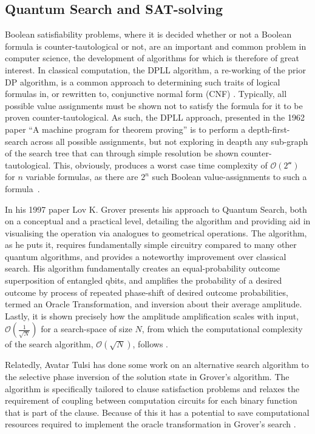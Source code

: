 \documentclass[msc,lith,english]{liuthesis}
\begin{document}
\subsection{Quantum Search and SAT-solving}
Boolean satisfiability problems, where it is decided whether or not a Boolean formula is counter-tautological or not, are an important and common problem in computer science, the development of algorithms for which is therefore of great interest. In classical computation, the DPLL algorithm, a re-working of the prior DP algorithm, is a common approach to determining such traits of logical formulas in, or rewritten to, conjunctive normal form (CNF) \cite{QWSBA}. Typically, all possible value assignments must be shown not to satisfy the formula for it to be proven counter-tautological. As such, the DPLL approach, presented in the 1962 paper ``A machine program for theorem proving'' is to perform a depth-first-search across all possible assignments, but not exploring in deapth any sub-graph of the search tree that can through simple resolution be shown counter-tautological. This, obviously, produces a worst case time complexity of $\mathcal{O(2^n)}$ for $n$ variable formulas, as there are $2^n$ such Boolean value-assignments to such a formula~\cite{DPLL}.  

In his 1997 paper Lov K. Grover presents his approach to Quantum Search, both on a conceptual and a practical level, detailing the algorithm and providing aid in visualising the operation via analogues to geometrical operations. The algorithm, as he puts it, requires fundamentally simple circuitry compared to many other quantum algorithms, and provides a noteworthy improvement over classical search. His algorithm fundamentally creates an equal-probability outcome superposition of entangled qbits, and amplifies the probability of a desired outcome by process of repeated phase-shift of desired outcome probabilities, termed an Oracle Transformation, and inversion about their average amplitude. Lastly, it is shown precisely how the amplitude amplification scales with input, $\mathcal{O}(\frac{1}{\sqrt{N}})$ for a search-space of size $N$, from which the computational complexity of the search algorithm, $\mathcal{O}(\sqrt{N})$, follows \cite{QMHSNH}.

Relatedly, Avatar Tulsi has done some work on an alternative search algorithm to the selective phase inversion of the solution state in Grover's algorithm. The algorithm is specifically tailored to clause satisfaction problems and relaxes the requirement of coupling between computation circuits for each binary function that is part of the clause. Because of this it has a potential to save computational resources required to implement the oracle transformation in Grover's search \cite{QuantumCSPSearch}.
\end{document}
